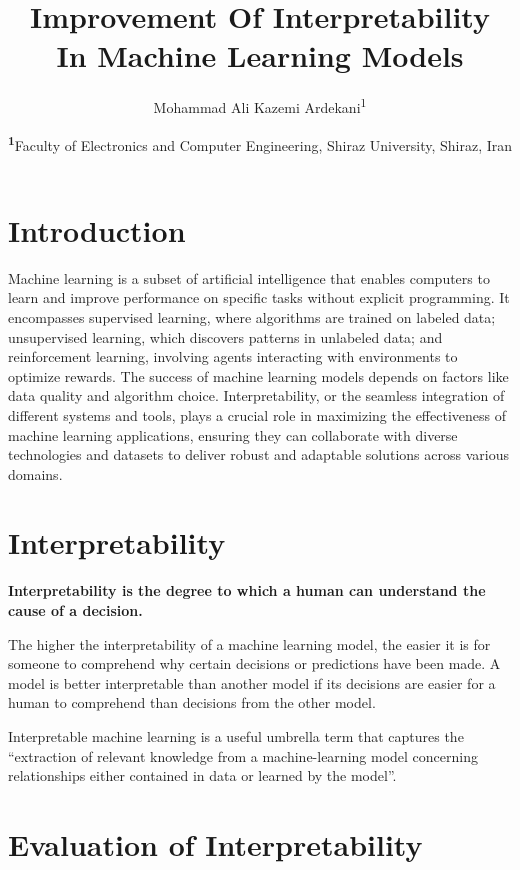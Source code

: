 \documentclass[a4paper, 10pt,]{JournalArticle}
\title{Improvement Of Interpretability \\ In Machine Learning Models} %
\author{
	Mohammad Ali Kazemi Ardekani\textsuperscript{1}
}
\date{\footnotesize\textsuperscript{\textbf{1}}Faculty of Electronics and Computer Engineering, Shiraz University, Shiraz, Iran}
\begin{document}
\maketitle
\section{Introduction}

Machine learning is a subset of artificial intelligence that enables computers to learn and improve performance on specific tasks without explicit programming. It encompasses supervised learning, where algorithms are trained on labeled data; unsupervised learning, which discovers patterns in unlabeled data; and reinforcement learning, involving agents interacting with environments to optimize rewards. The success of machine learning models depends on factors like data quality and algorithm choice. Interpretability, or the seamless integration of different systems and tools, plays a crucial role in maximizing the effectiveness of machine learning applications, ensuring they can collaborate with diverse technologies and datasets to deliver robust and adaptable solutions across various domains. \cite{mitchell1997machine}


\section{Interpretability}
\textbf{Interpretability is the degree to which a human can understand the cause of a decision.} \cite{miller2019explanation}

The higher the interpretability of a machine learning model, the easier it is for someone to comprehend why certain decisions or predictions have been made. A model is better interpretable than another model if its decisions are easier for a human to comprehend than decisions from the other model.

Interpretable machine learning is a useful umbrella term that captures the “extraction of relevant knowledge from a machine-learning model concerning relationships either contained in data or learned by the model”.


\section{Evaluation of Interpretability}
\end{document}
